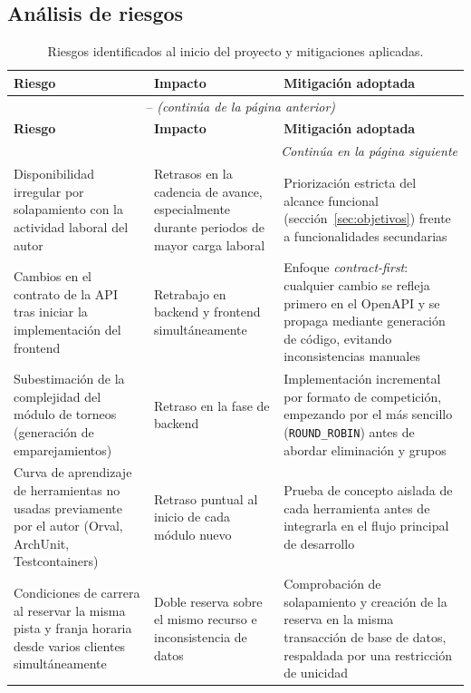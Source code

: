 \subsection{Análisis de riesgos}

\begin{longtable}{p{3.4cm}p{3.9cm}p{4.8cm}}
\caption{Riesgos identificados al inicio del proyecto y mitigaciones aplicadas.}
\label{tab:riesgos} \\
\hline
\textbf{Riesgo} & \textbf{Impacto} & \textbf{Mitigación adoptada} \\
\hline
\endfirsthead
\multicolumn{3}{c}{\tablename\ \thetable{} -- \textit{(continúa de la página anterior)}} \\
\hline
\textbf{Riesgo} & \textbf{Impacto} & \textbf{Mitigación adoptada} \\
\hline
\endhead
\hline
\multicolumn{3}{r}{\textit{Continúa en la página siguiente}} \\
\endfoot
\hline
\endlastfoot
Disponibilidad irregular por solapamiento con la actividad laboral del autor &
  Retrasos en la cadencia de avance, especialmente durante periodos de
  mayor carga laboral &
  Priorización estricta del alcance funcional (sección~\ref{sec:objetivos})
  frente a funcionalidades secundarias \\
Cambios en el contrato de la API tras iniciar la implementación del frontend &
  Retrabajo en backend y frontend simultáneamente &
  Enfoque \textit{contract-first}: cualquier cambio se refleja primero en el
  OpenAPI y se propaga mediante generación de código, evitando
  inconsistencias manuales \\
Subestimación de la complejidad del módulo de torneos (generación de
  emparejamientos) &
  Retraso en la fase de backend &
  Implementación incremental por formato de competición, empezando por el más
  sencillo (\texttt{ROUND\_ROBIN}) antes de abordar eliminación y grupos \\
Curva de aprendizaje de herramientas no usadas previamente por el autor
  (Orval, ArchUnit, Testcontainers) &
  Retraso puntual al inicio de cada módulo nuevo &
  Prueba de concepto aislada de cada herramienta antes de integrarla en el
  flujo principal de desarrollo \\
Condiciones de carrera al reservar la misma pista y franja horaria desde
  varios clientes simultáneamente &
  Doble reserva sobre el mismo recurso e inconsistencia de datos &
  Comprobación de solapamiento y creación de la reserva en la misma
  transacción de base de datos, respaldada por una restricción de unicidad

\end{longtable}
